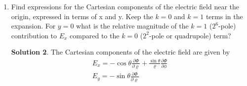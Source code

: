 \documentclass[letter,12pt]{article}
\theoremstyle{definition}
\newtheorem*{sol}{Solution}
\begin{document}
\begin{enumerate}
\begin{enumerate}
\begin{sol}
\begin{align*}
                            \Phi(\varrho, \phi) &=
                            \frac{\lambda}{2 \pi \epsilon_0}
                            \Re
                            \left\{
                            \ln
                                \left[
                                    \frac
                                    {
                                    \left(i\varrho + ae^{i\phi}\right)
                                    \left(i\varrho - ae^{i\phi}\right)
                                    }{
                                    \left(\varrho + ae^{i\phi}\right)
                                    \left(\varrho - ae^{i\phi}\right)
                                    }
                                \right]
                            \right\}
                        \end{align*}
                        Multiply the fraction by $i^2$ to obtain
                        $\Phi = \Re\left[w(\varrho)\right]$
                        \\
                        This is related to problem 2.3 since that
                        problem can be solved with the original line
                        charge and 3 image charges, corresponding to
                        the 4 line charges surrounding the
                        accelerator. Simply take one of the line
                        charges to be at $(x_0, y_0)$ where $x_0 =
                        y_0$
                    \end{sol}
                \item
                    Find expressions for the Cartesian components of
                    the electric field near the origin, expressed in
                    terms of x and y. Keep the $k = 0$ and $k = 1$
                    terms in the expansion. For $y = 0$ what is the
                    relative magnitude of the $k = 1$ ($2^6$-pole)
                    contribution to $E_x$ compared to the $k=0$
                    ($2^2$-pole or quadrupole) term?
                    \begin{sol}
                        The Cartesian components of the electric field are given by
                        \begin{align*}
                            E_x = -\cos{\theta} \frac{\partial \Phi}{\partial \varrho}
                            + \frac{\sin{\theta}}{\varrho}\frac{\partial \Phi}{\partial \phi}
                            \\
                            E_y = -\sin{\theta} \frac{\partial \Phi}{\partial \varrho}

\end{align*}
\end{sol}
\end{enumerate}
\end{enumerate}
\end{document}
